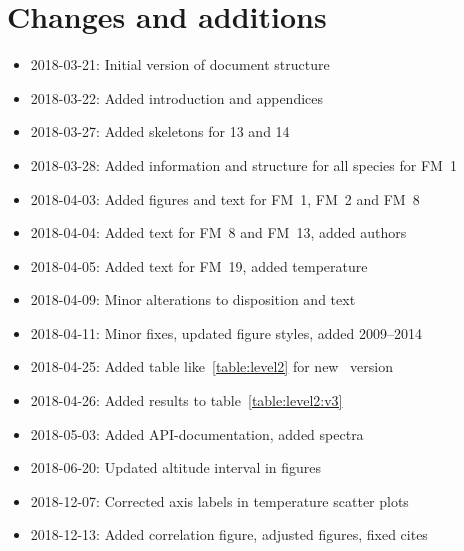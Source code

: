 \chapter{Changes and additions}
\label{ch:changes}

\begin{itemize}
    \item 2018-03-21: Initial version of document structure
    \item 2018-03-22: Added introduction and appendices
    \item 2018-03-27: Added skeletons for 13 and 14
    \item 2018-03-28: Added information and structure for all species for FM~1
    \item 2018-04-03: Added figures and text for FM~1, FM~2 and FM~8
    \item 2018-04-04: Added text for FM~8 and FM~13, added authors
    \item 2018-04-05: Added text for FM~19, added temperature
    \item 2018-04-09: Minor alterations to disposition and text
    \item 2018-04-11: Minor fixes, updated figure styles, added 2009--2014
    \item 2018-04-25: Added table like~\ref{table:level2} for new \smr~version
    \item 2018-04-26: Added results to table~\ref{table:level2:v3}
    \item 2018-05-03: Added API-documentation, added spectra
    \item 2018-06-20: Updated altitude interval in figures
    \item 2018-12-07: Corrected axis labels in temperature scatter plots
    \item 2018-12-13: Added correlation figure, adjusted figures, fixed cites
\end{itemize}
